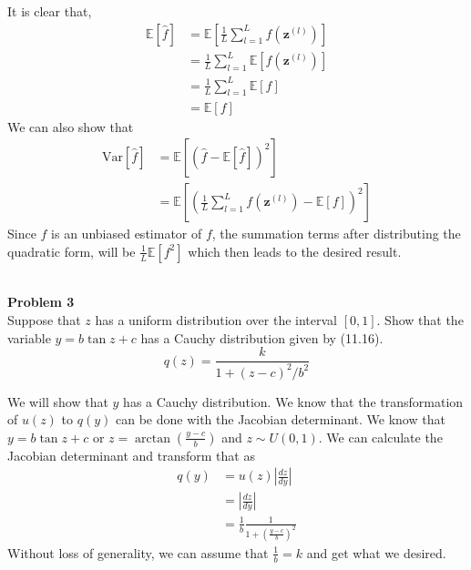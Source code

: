 \documentclass{article}
\begin{document}
\color{blue}
\begin{sol}
    It is clear that,
    \begin{align*}
        \mathbb{E}[\hat{f}] &= \mathbb{E}\left[\frac{1}{L} \sum_{l=1}^L f(\mathbf{z}^{(l)})\right]\\
        &= \frac{1}{L} \sum_{l=1}^L \mathbb{E}[f(\mathbf{z}^{(l)})]\\
        &= \frac{1}{L} \sum_{l=1}^L \mathbb{E}[f]\\
        &= \mathbb{E}[f]
    \end{align*}
    We can also show that
    \begin{align*}
        \text{Var}[\hat{f}] &= \mathbb{E}[(\hat{f}-\mathbb{E}[\hat{f}])^2]\\
        &= \mathbb{E}\left[\left(\frac{1}{L} \sum_{l=1}^L f(\mathbf{z}^{(l)})-\mathbb{E}[f]\right)^2\right]
    \end{align*}
    Since $\hat{f}$ is an unbiased estimator of $f$, the summation terms after distributing the quadratic form, will be $\frac{1}{L}\mathbb{E}[f^2]$ which then leads to the desired result.
\end{sol}
\color{black}
\leavevmode\\
\noindent
\Large{\textbf{Problem 3}}\normalsize
\\

Suppose that $z$ has a uniform distribution over the interval $[0, 1]$. Show that the variable $y = b \tan
z + c$ has a Cauchy distribution given by (11.16). 
\[ q(z) = \frac{k}{1+(z-c)^2/b^2}\]
\color{blue}
\begin{sol}
We will show that $y$ has a Cauchy distribution. We know that the transformation of $u(z)$ to $q(y)$ can 
be done with the Jacobian determinant. We know that $y = b \tan z + c$ or $z = \arctan\left(\frac{y-c}{b}\right)$ and $z \sim U(0,1)$. We can
calculate the Jacobian determinant and transform that as
\begin{align*}
    q(y) &= u(z)\left|\frac{dz}{dy}\right|\\
    &= \left|\frac{dz}{dy}\right|\\
    &=  \frac{1}{b}\frac{1}{1 + \left(\frac{y - c}{b}\right)^2}
\end{align*}
Without loss of generality, we can assume that $\frac{1}{b} = k$ and get what we desired.
\end{sol}
\color{black}
\end{document}
